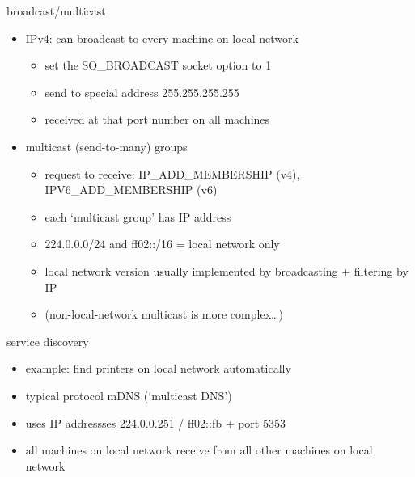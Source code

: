 \begin{frame}{broadcast/multicast}
\begin{itemize}
\item IPv4: can broadcast to every machine on local network
    \begin{itemize}
    \item set the SO\_BROADCAST socket option to 1
    \item send to special address 255.255.255.255 
    \item received at that port number on all machines
    \end{itemize}
\item multicast (send-to-many) groups
    \begin{itemize}
    \item request to receive: IP\_ADD\_MEMBERSHIP (v4), IPV6\_ADD\_MEMBERSHIP (v6)
    \item each `multicast group' has IP address
    \item 224.0.0.0/24 and ff02::/16 = local network only
    \item local network version usually implemented by broadcasting + filtering by IP
    \item (non-local-network multicast is more complex\ldots)
    \end{itemize}
\end{itemize}
\end{frame}

\begin{frame}{service discovery}
\begin{itemize}
\item example: find printers on local network automatically
\vspace{.5cm}
\item typical protocol mDNS (`multicast DNS')
\item uses IP addressses 224.0.0.251 / ff02::fb + port 5353
\item all machines on local network receive from all other machines on local network
\end{itemize}
\end{frame}

